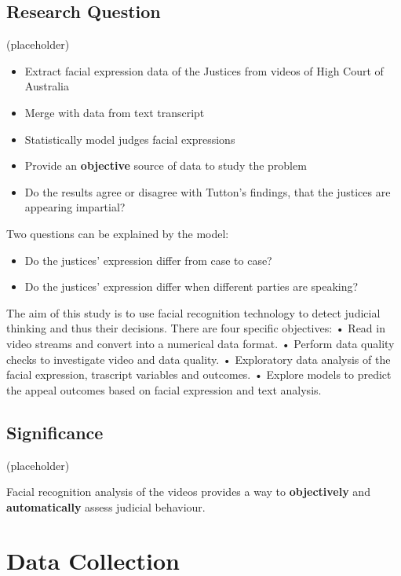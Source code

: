 \documentclass{monashthesis}
\begin{document}
\hypertarget{research-question}{%
\section{Research Question}\label{research-question}}

(placeholder)

\begin{itemize}
\item
  Extract facial expression data of the Justices from videos of High Court of Australia
\item
  Merge with data from text transcript
\item
  Statistically model judges facial expressions
\item
  Provide an \textbf{objective} source of data to study the problem
\item
  Do the results agree or disagree with Tutton's findings, that the justices are appearing impartial?
\end{itemize}

Two questions can be explained by the model:

\begin{itemize}
\tightlist
\item
  Do the justices' expression differ from case to case?
\item
  Do the justices' expression differ when different parties are speaking?
\end{itemize}

The aim of this study is to use facial recognition technology to detect judicial thinking and thus their decisions. There are four specific objectives:
• Read in video streams and convert into a numerical data format.
• Perform data quality checks to investigate video and data quality.
• Exploratory data analysis of the facial expression, trascript variables and outcomes.
• Explore models to predict the appeal outcomes based on facial expression and text analysis.

\hypertarget{significance}{%
\section{Significance}\label{significance}}

(placeholder)

Facial recognition analysis of the videos provides a way to \textbf{objectively} and \textbf{automatically} assess judicial behaviour.

\hypertarget{data-collection}{%
\chapter{Data Collection}\label{data-collection}}
\end{document}
